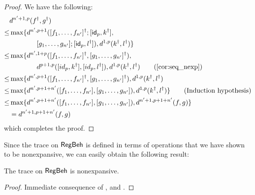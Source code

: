 \begin{proof}
	We have the following:
	\begin{align*}
		&d^{n' + 1, p}(f^\dagger, g^\dagger)\\
		\leq & \max \{d^{n', p + 1}(\lc f_1, \dots, f_{n'}\rc^\dagger; \lc \id_p,k^\dagger\rc,\\&\qquad\qquad  \lc g_1, \dots, g_{n'}\rc; \lc \id_p , l^\dagger\rc), d^{1,p}(k^\dagger, l^\dagger)\}\\
		\leq & \max \{d^{n', 1 + p}(\lc f_1, \dots, f_{n'}\rc^\dagger, \lc g_1, \dots, g_{n'}\rc^\dagger),\\&\qquad\qquad  d^{p + 1, p}(\lc id_p , k^\dagger\rc, \lc id_p ,l^\dagger\rc),  d^{1,p}(k^\dagger, l^\dagger) \tag{\Cref{cor:seq_nexp}}\\
		\leq & \max \{d^{n', p + 1}(\lc f_1, \dots, f_{n'}\rc^\dagger, \lc g_1, \dots, g_{n'}\rc^\dagger), d^{1,p}(k^\dagger, l^\dagger)\\
		\leq & \max \{d^{n', p + 1 + n'}(\lc f_1, \dots, f_{n'}\rc, \lc g_1, \dots, g_{n'}\rc ), d^{1,p}(k^\dagger, l^\dagger)\} \tag{Induction hypothesis}\\
		\leq & \max \{d^{n', p + 1 + n'}(\lc f_1, \dots, f_{n'}\rc, \lc g_1, \dots, g_{n'}\rc ),  d^{n' + 1, p + 1 + n'}(f,g)\} \\
		&=  d^{n' + 1, p + 1 + n'}(f,g)
	\end{align*}
	which completes the proof.
\end{proof}
Since the trace on $\mathsf{RegBeh}$ is defined in terms of operations that we have shown to be nonexpansive, we can easily obtain the following result:
\begin{corollary}\label{cor:trace_nonexpansive}
	The trace on $\mathsf{RegBeh}$ is nonexpansive.
\end{corollary}
\begin{proof}
	Immediate consequence of ,  and .
\end{proof}
